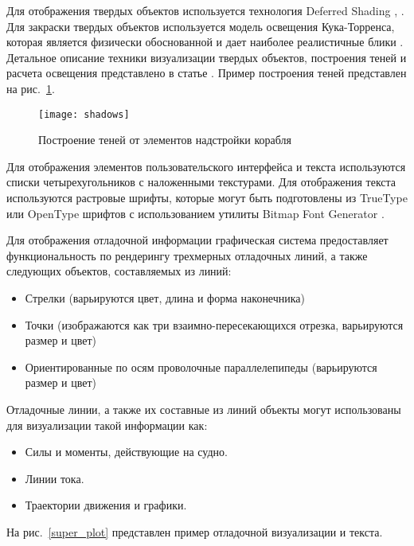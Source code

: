 Для отображения твердых объектов используется технология Deferred Shading \citep{stalker}, \citep{killzone}.
Для закраски твердых объектов используется модель освещения Кука-Торренса, которая является физически обоснованной \citep{cook_torrance} и дает наиболее реалистичные блики \citep{ngan}.
Детальное описание техники визуализации твердых объектов, построения теней и расчета освещения представлено в статье \citep{bezgodov08}.
Пример построения теней представлен на рис.~\ref{shadows}.

\begin{figure}[ht]
\begin{center}
\texttt{[image: shadows]}
\end{center}
\caption{Построение теней от элементов надстройки корабля}
\label{shadows}
\end{figure}



Для отображения элементов пользовательского интерфейса и текста используются списки  четырехугольников с наложенными текстурами.
Для отображения текста используются растровые шрифты, которые могут быть подготовлены из TrueType или OpenType шрифтов с использованием утилиты Bitmap Font Generator \citep{bmfont}.

Для отображения отладочной информации графическая система предоставляет функциональность по рендерингу трехмерных отладочных линий, 
а также следующих объектов, составляемых из линий:

\begin{itemize}
	\item	Стрелки (варьируются цвет, длина и форма наконечника)
	\item	Точки (изображаются как три взаимно-пересекающихся отрезка, варьируются размер и цвет)
	\item	Ориентированные по осям проволочные параллелепипеды (варьируются размер и цвет)
\end{itemize}

Отладочные линии, а также их составные из линий объекты могут использованы для визуализации такой информации как:
\begin{itemize}
	\item	Силы и моменты, действующие на судно.
	\item	Линии тока.
	\item	Траектории движения и графики.
\end{itemize}

На рис.~\ref{super_plot} представлен пример отладочной визуализации и текста.

